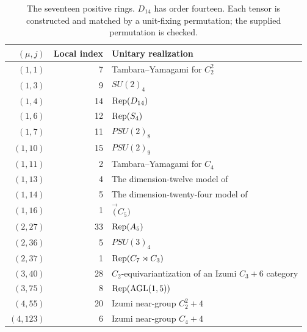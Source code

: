 \begin{table}[ht]\centering\small
\begin{tabular}{rrl}\toprule
$(\mu,j)$&Local index&Unitary realization\\\midrule
$(1,1)$&7&Tambara--Yamagami for $C_2^2$\\
$(1,3)$&9&$SU(2)_4$\\
$(1,4)$&14&$\operatorname{Rep}(D_{14})$\\
$(1,6)$&12&$\operatorname{Rep}(S_4)$\\
$(1,7)$&11&$PSU(2)_8$\\
$(1,10)$&15&$PSU(2)_9$\\
$(1,11)$&2&Tambara--Yamagami for $C_4$\\
$(1,13)$&4&The dimension-twelve model of \cite{LPR}\\
$(1,14)$&5&The dimension-twenty-four model of \cite{LPR}\\
$(1,16)$&1&$\Vec(C_5)$\\
$(2,27)$&33&$\operatorname{Rep}(A_5)$\\
$(2,36)$&5&$PSU(3)_4$\\
$(2,37)$&1&$\operatorname{Rep}(C_7\rtimes C_3)$\\
$(3,40)$&28&$C_2$-equivariantization of an Izumi $C_3+6$ category\\
$(3,75)$&8&$\operatorname{Rep}(\operatorname{AGL}(1,5))$\\
$(4,55)$&20&Izumi near-group $C_2^2+4$\\
$(4,123)$&6&Izumi near-group $C_4+4$\\
\bottomrule\end{tabular}
\caption{The seventeen positive rings. $D_{14}$ has order fourteen. Each tensor is constructed and matched by a unit-fixing permutation; the supplied permutation is checked.}\label{tab:models}\end{table}

